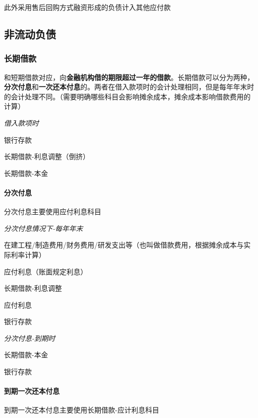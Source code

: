 \documentclass[UTF8,12pt]{ctexart}
\newenvironment{Dr}{%
	\begin{list}{}%
		{
			\setlength{\leftmargin}{2em}
			\setlength{\labelwidth}{2em}
			\setlength{\labelsep}{0pt}
			\setlength{\itemindent}{0pt}
			\setlength{\listparindent}{0pt}
			\setlength{\parsep}{0pt}
			\setlength{\topsep}{0pt}
		}
		\item[\textbf{借：}]
	}{%
	\end{list}
}
\newenvironment{Cr}{%
	\begin{list}{}%
		{
			\setlength{\leftmargin}{3em}
			\setlength{\labelwidth}{2em}
			\setlength{\labelsep}{0pt}
			\setlength{\itemindent}{0pt}
			\setlength{\listparindent}{0pt}
			\setlength{\parsep}{0pt}
			\setlength{\topsep}{0pt}
		}
		\item[\textbf{贷：}]
	}{%
	\end{list}
}
\numberwithin{equation}{section} %
\numberwithin{figure}{section}
\numberwithin{table}{section}
\begin{document}
	此外采用售后回购方式融资形成的负债计入其他应付款
	
	
	\subsection{非流动负债}
	\subsubsection{长期借款}
	和短期借款对应，向\textbf{金融机构借的期限超过一年的借款}。长期借款可以分为两种，\textbf{分次付息}和\textbf{一次还本付息}的。两者在借入款项时的会计处理相同，但是每年年末时的会计处理不同。（需要明确哪些科目会影响摊余成本，摊余成本影响借款费用的计算）
	
	\textit{借入款项时}
	
	\begin{Dr}
		银行存款
		
		长期借款-利息调整（倒挤）
	\end{Dr}	
	\begin{Cr}
		长期借款-本金
	\end{Cr}

	\paragraph{分次付息} 分次付息主要使用应付利息科目

	\textit{分次付息情况下-每年年末}
	
	\begin{Dr}
		在建工程/制造费用/财务费用/研发支出等（也叫做借款费用，根据摊余成本与实际利率计算）
	\end{Dr}
	\begin{Cr}
		应付利息（账面规定利息）
		
		长期借款-利息调整
	\end{Cr}
	\begin{Dr}
		应付利息
	\end{Dr}
	\begin{Cr}
		银行存款
	\end{Cr}

	
	\textit{分次付息-到期时}
	
	\begin{Dr}
		长期借款-本金
	\end{Dr}
	\begin{Cr}
		银行存款
	\end{Cr}

	\paragraph{到期一次还本付息} 到期一次还本付息主要使用长期借款-应计利息科目
\end{document}
